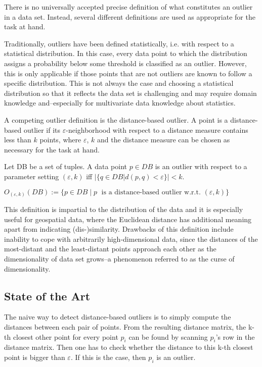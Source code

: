 \documentclass[runningheads]{llncs}
\begin{document}
There is no universally accepted precise definition of what constitutes an outlier in a data set. Instead, several different definitions are used as appropriate for the task at hand.

Traditionally, outliers have been defined statistically, i.e. with respect to a statistical distribution. In this case, every data point to which the distribution assigns a probability below some threshold is classified as an outlier. However, this is only applicable if those points that are not outliers are known to follow a specific distribution. This is not always the case and choosing a statistical distribution so that it reflects the data set is challenging and may require domain knowledge and--especially for multivariate data knowledge about statistics.

A competing outlier definition is the distance-based outlier. A point is a distance-based outlier if its $\varepsilon$-neighborhood with respect to a distance measure contains less than $k$ points, where $\varepsilon$, $k$ and the distance measure can be chosen as necessary for the task at hand.

\begin{definition}
    Let DB be a set of tuples. A data point $p\in DB$ is an outlier with respect to a parameter setting $(\varepsilon,k)$ iff 
    $|\{q \in DB | d(p,q) < \varepsilon\}| < k$.

    $O_{(\varepsilon,k)}(DB) := \{p\in DB \;| \;p\;\text{ is a distance-based outlier w.r.t. }(\varepsilon,k) \}$
\end{definition}

This definition is impartial to the distribution of the data and it is especially useful for geospatial data, where the Euclidean distance has additional meaning apart from indicating (dis-)similarity. Drawbacks of this definition include inability to cope with arbitrarily high-dimensional data, since the distances of the most-distant and the least-distant points approach each other as the dimensionality of data set grows--a phenomenon referred to as the curse of dimensionality. %
\subsection{State of the Art}

The naive way to detect distance-based outliers is to simply compute the distances between each pair of points. From the resulting distance matrix, the k-th closest other point for every point $p_i$ can be found by scanning $p_i$'s row in the distance matrix. Then one has to check whether the distance to this k-th closest point is bigger than $\varepsilon$. If this is the case, then $p_i$ is an outlier.
\end{document}
